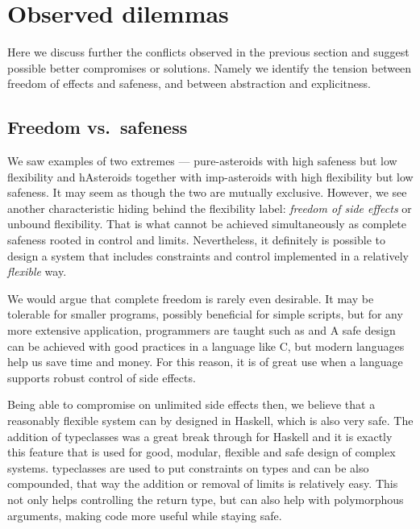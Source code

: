 \documentclass[
  digital, %
  color,   %
  table,   %
  oneside, %
  lof,     %
  lot,     %
]{fithesis3}
\newcommand{\vs}{vs.\ }
\begin{document}
{%






\section{Observed dilemmas}
\label{sect:dilemmas}

Here we discuss further the conflicts observed in the previous section
and suggest possible better compromises or solutions.
Namely we identify the tension between freedom of effects and safeness,
and between abstraction and explicitness.



\subsection{Freedom \vs safeness}
We saw examples of two extremes --- pure-asteroids with high safeness but low flexibility
and hAsteroids together with imp-asteroids with high flexibility but low safeness.
It may seem as though the two are mutually exclusive. However, we see another
characteristic hiding behind the flexibility label: \emph{freedom of side effects}
or unbound flexibility. That is what cannot be achieved
simultaneously as complete safeness rooted in control and limits.
Nevertheless, it definitely is possible to design a system that includes
constraints and control implemented in a relatively \emph{flexible} way.

We would argue that complete freedom is rarely even desirable.
It may be tolerable for smaller programs, possibly beneficial for simple scripts,
but for any more extensive application, programmers are taught  such as
 and 
A safe design can be achieved with good practices in a language like C,
but modern languages help us save time and money.
For this reason, it is of great use when a language supports robust control
of side effects.

Being able to compromise on unlimited side effects then, we believe that a reasonably flexible
system can by designed in Haskell, which is also very safe.
The addition of typeclasses was a great break through for Haskell and it is exactly this
feature that is used for good, modular, flexible and safe design of complex systems.
typeclasses are used to put constraints on types and can be also compounded,
that way the addition or removal of limits is relatively easy.
This not only helps controlling the return type, but can also help
with polymorphous arguments, making code more useful while staying safe.

}
\end{document}

